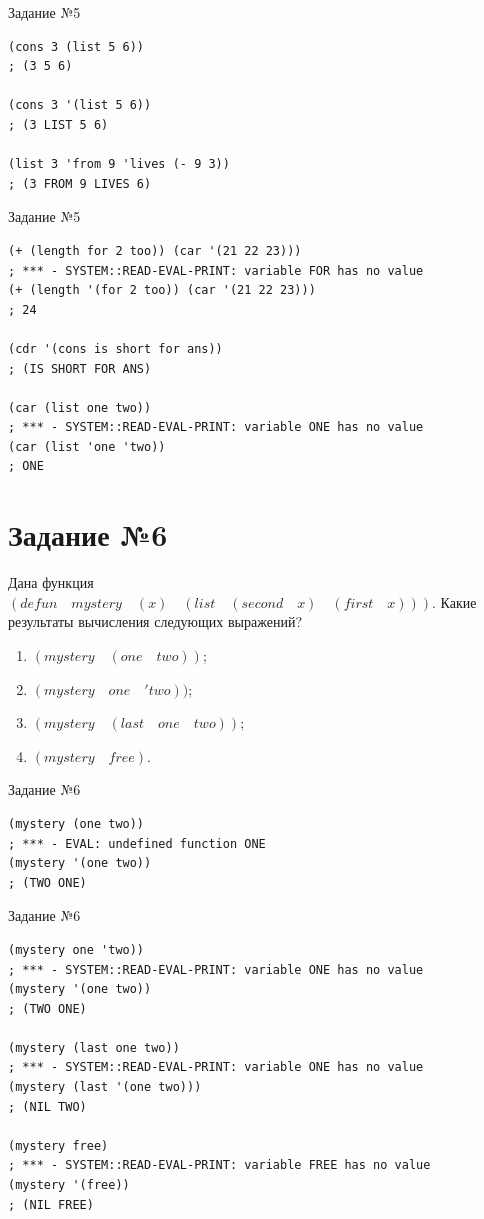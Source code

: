 \begin{code}
\caption{Задание №5}
\label{code:bf5}
\begin{verbatim}
(cons 3 (list 5 6))
; (3 5 6)

(cons 3 '(list 5 6))
; (3 LIST 5 6)

(list 3 'from 9 'lives (- 9 3))
; (3 FROM 9 LIVES 6)
\end{verbatim}
\end{code}

\newpage

\begin{code}
\caption{Задание №5}
\label{code:bf5}
\begin{verbatim}
(+ (length for 2 too)) (car '(21 22 23)))
; *** - SYSTEM::READ-EVAL-PRINT: variable FOR has no value
(+ (length '(for 2 too)) (car '(21 22 23)))
; 24

(cdr '(cons is short for ans))
; (IS SHORT FOR ANS)

(car (list one two))
; *** - SYSTEM::READ-EVAL-PRINT: variable ONE has no value
(car (list 'one 'two))
; ONE
\end{verbatim}
\end{code}

\section{Задание №6}
Дана функция $(defun \quad mystery \quad (x) \quad (list \quad (second \quad x) \quad (first \quad x)))$. Какие результаты вычисления следующих выражений?
\begin{enumerate}
	\item $(mystery \quad (one \quad two))$;
	\item $(mystery \quad one \quad 'two))$;
	\item $(mystery \quad (last \quad one \quad two))$;
	\item $(mystery \quad free)$.
\end{enumerate}

\begin{code}
\caption{Задание №6}
\label{code:bf4}
\begin{verbatim}
(mystery (one two))
; *** - EVAL: undefined function ONE
(mystery '(one two))
; (TWO ONE)
\end{verbatim}
\end{code}

\newpage

\begin{code}
\caption{Задание №6}
\label{code:bf4}
\begin{verbatim}
(mystery one 'two))
; *** - SYSTEM::READ-EVAL-PRINT: variable ONE has no value
(mystery '(one two))
; (TWO ONE)

(mystery (last one two))
; *** - SYSTEM::READ-EVAL-PRINT: variable ONE has no value
(mystery (last '(one two)))
; (NIL TWO)

(mystery free)
; *** - SYSTEM::READ-EVAL-PRINT: variable FREE has no value
(mystery '(free))
; (NIL FREE)
\end{verbatim}
\end{code}

